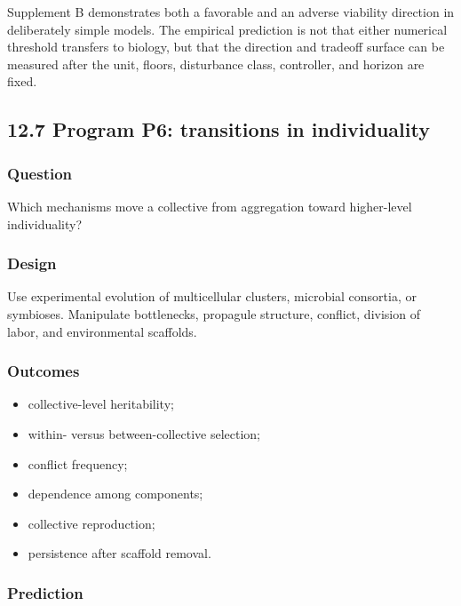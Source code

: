 \documentclass[
  11pt,
]{article}
\providecommand{\tightlist}{%
  \setlength{\itemsep}{0pt}\setlength{\parskip}{0pt}}
\begin{document}
Supplement B demonstrates both a favorable and an adverse viability
direction in deliberately simple models. The empirical prediction is not
that either numerical threshold transfers to biology, but that the
direction and tradeoff surface can be measured after the unit, floors,
disturbance class, controller, and horizon are fixed.

\subsection{12.7 Program P6: transitions in
individuality}\label{program-p6-transitions-in-individuality}

\subsubsection{Question}\label{question-5}

Which mechanisms move a collective from aggregation toward higher-level
individuality?

\subsubsection{Design}\label{design-5}

Use experimental evolution of multicellular clusters, microbial
consortia, or symbioses. Manipulate bottlenecks, propagule structure,
conflict, division of labor, and environmental scaffolds.

\subsubsection{Outcomes}\label{outcomes-1}

\begin{itemize}
\tightlist
\item
  collective-level heritability;
\item
  within- versus between-collective selection;
\item
  conflict frequency;
\item
  dependence among components;
\item
  collective reproduction;
\item
  persistence after scaffold removal.
\end{itemize}

\subsubsection{Prediction}\label{prediction-1}
\end{document}
